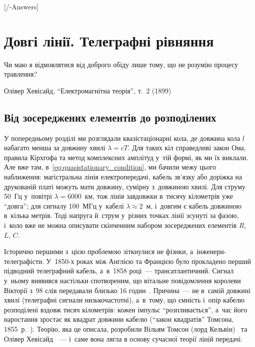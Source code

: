 
[\currfilebase/\currfilebase-Answers]
\chapter{Довгі лінії. Телеграфні рівняння}\label{\currfilebase}\hypertarget{Telegraph}{}
\graphicspath{{\currfilebase/Pictures}}

\epigraph{\Alexander Чи маю я відмовлятися від доброго обіду лише тому, що не розумію процесу травлення?}{Олівер
Хевісайд, \enquote{Електромагнітна теорія}, т.~2 (1899)}

\section{Від зосереджених елементів до розподілених}\hypertarget{lumped-to-distributed-elements}{}

У попередньому розділі ми розглядали квазістаціонарні кола, де довжина кола $l$ набагато менша за довжину хвилі $\lambda = cT$. Для таких кіл справедливі закон Ома, правила Кірхгофа та метод комплексних амплітуд у~тій формі, як ми їх виклали. Але вже там, в~\eqref{eq:quasistationary_condition}, ми бачили межу цього наближення: магістральна лінія електропередачі, кабель зв'язку або доріжка на друкованій платі можуть мати довжину, сумірну з~довжиною хвилі. Для струму 50~Гц у~повітрі $\lambda=6000$~км, тож лінія завдовжки в~тисячу кілометрів уже \enquote{довга}; для сигналу 100~МГц у~кабелі $\lambda\approx2$~м, і~довгим є кабель довжиною в~кілька метрів. Тоді напруга й~струм у~різних точках лінії зсунуті за фазою, і~коло вже не можна описувати скінченним набором зосереджених елементів $R$, $L$, $C$.

\begin{Historical}
	Історично першими з~цією проблемою зіткнулися не фізики, а~інженери-телеграфісти. У~1850-х роках між Англією та Францією
	було прокладено перший підводний телеграфний кабель, а~в~1858 році~--- трансатлантичний. Сигнал у~ньому виявився настільки
	спотвореним, що вітальне повідомлення королеви Вікторії з~98 слів передавали близько 16 годин~\cite{Echoes1858Cable}. Причина~--- не в~самій довжині
	хвилі (телеграфні сигнали низькочастотні), а~в~тому, що ємність і~опір кабелю розподілені вздовж тисяч кілометрів: кожен
	імпульс \enquote{розпливається}, а~час його наростання зростає як квадрат довжини кабелю (\enquote{закон квадратів}
	Томсона, 1855~р.~\cite{Thomson1855}). Теорію, яка це описала, розробили Вільям Томсон (лорд Кельвін)~\cite{Thomson1855} та Олівер Хевісайд~\cite{Heaviside1892}~--- і~саме вона
	лягла в основу сучасної теорії ліній передачі.
\end{Historical}

